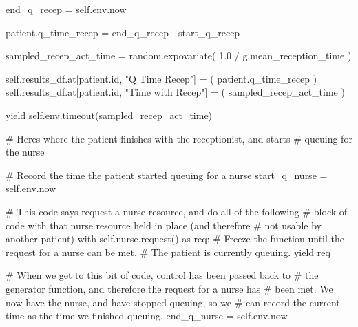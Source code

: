 \documentclass[
  letterpaper,
  DIV=11,
  numbers=noendperiod]{scrreprt}
\newenvironment{Shaded}{}{}
\newcommand{\BuiltInTok}[1]{\textcolor[rgb]{0.84,0.23,0.29}{#1}}
\newcommand{\CommentTok}[1]{\textcolor[rgb]{0.42,0.45,0.49}{#1}}
\newcommand{\ControlFlowTok}[1]{\textcolor[rgb]{0.84,0.23,0.29}{#1}}
\newcommand{\FloatTok}[1]{\textcolor[rgb]{0.00,0.36,0.77}{#1}}
\newcommand{\ImportTok}[1]{\textcolor[rgb]{0.01,0.18,0.38}{#1}}
\newcommand{\NormalTok}[1]{\textcolor[rgb]{0.14,0.16,0.18}{#1}}
\newcommand{\OperatorTok}[1]{\textcolor[rgb]{0.14,0.16,0.18}{#1}}
\newcommand{\StringTok}[1]{\textcolor[rgb]{0.01,0.18,0.38}{#1}}
\newcommand{\VariableTok}[1]{\textcolor[rgb]{0.89,0.38,0.04}{#1}}
\begin{document}
\begin{tcolorbox}
\begin{Shaded}
\begin{Highlighting}[]
\NormalTok{            end\_q\_recep }\OperatorTok{=} \VariableTok{self}\NormalTok{.env.now}

\NormalTok{            patient.q\_time\_recep }\OperatorTok{=}\NormalTok{ end\_q\_recep }\OperatorTok{{-}}\NormalTok{ start\_q\_recep}

\NormalTok{            sampled\_recep\_act\_time }\OperatorTok{=}\NormalTok{ random.expovariate(}
                \FloatTok{1.0} \OperatorTok{/}\NormalTok{ g.mean\_reception\_time}
\NormalTok{            )}

            \VariableTok{self}\NormalTok{.results\_df.at[patient.}\BuiltInTok{id}\NormalTok{, }\StringTok{"Q Time Recep"}\NormalTok{] }\OperatorTok{=}\NormalTok{ (}
\NormalTok{                 patient.q\_time\_recep}
\NormalTok{            )}
            \VariableTok{self}\NormalTok{.results\_df.at[patient.}\BuiltInTok{id}\NormalTok{, }\StringTok{"Time with Recep"}\NormalTok{] }\OperatorTok{=}\NormalTok{ (}
\NormalTok{                 sampled\_recep\_act\_time}
\NormalTok{            )}

            \ControlFlowTok{yield} \VariableTok{self}\NormalTok{.env.timeout(sampled\_recep\_act\_time)}

        \CommentTok{\# Here\textquotesingle{}s where the patient finishes with the receptionist, and starts}
        \CommentTok{\# queuing for the nurse}

        \CommentTok{\# Record the time the patient started queuing for a nurse}
\NormalTok{        start\_q\_nurse }\OperatorTok{=} \VariableTok{self}\NormalTok{.env.now}

        \CommentTok{\# This code says request a nurse resource, and do all of the following}
        \CommentTok{\# block of code with that nurse resource held in place (and therefore}
        \CommentTok{\# not usable by another patient)}
        \ControlFlowTok{with} \VariableTok{self}\NormalTok{.nurse.request() }\ImportTok{as}\NormalTok{ req:}
            \CommentTok{\# Freeze the function until the request for a nurse can be met.}
            \CommentTok{\# The patient is currently queuing.}
            \ControlFlowTok{yield}\NormalTok{ req}

            \CommentTok{\# When we get to this bit of code, control has been passed back to}
            \CommentTok{\# the generator function, and therefore the request for a nurse has}
            \CommentTok{\# been met.  We now have the nurse, and have stopped queuing, so we}
            \CommentTok{\# can record the current time as the time we finished queuing.}
\NormalTok{            end\_q\_nurse }\OperatorTok{=} \VariableTok{self}\NormalTok{.env.now}


\end{Highlighting}
\end{Shaded}
\end{tcolorbox}
\end{document}
